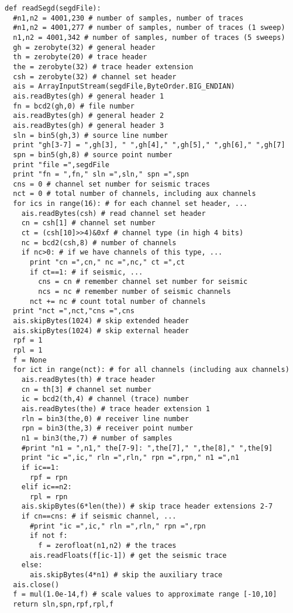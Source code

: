 \documentclass[11pt]{article}
\begin{document}
\begin{enumerate}
\begin{lstlisting}
def readSegd(segdFile):
  #n1,n2 = 4001,230 # number of samples, number of traces
  #n1,n2 = 4001,277 # number of samples, number of traces (1 sweep)
  n1,n2 = 4001,342 # number of samples, number of traces (5 sweeps)
  gh = zerobyte(32) # general header
  th = zerobyte(20) # trace header
  the = zerobyte(32) # trace header extension
  csh = zerobyte(32) # channel set header
  ais = ArrayInputStream(segdFile,ByteOrder.BIG_ENDIAN)
  ais.readBytes(gh) # general header 1
  fn = bcd2(gh,0) # file number
  ais.readBytes(gh) # general header 2
  ais.readBytes(gh) # general header 3
  sln = bin5(gh,3) # source line number
  print "gh[3-7] = ",gh[3], " ",gh[4]," ",gh[5]," ",gh[6]," ",gh[7] 
  spn = bin5(gh,8) # source point number
  print "file =",segdFile
  print "fn = ",fn," sln =",sln," spn =",spn
  cns = 0 # channel set number for seismic traces
  nct = 0 # total number of channels, including aux channels
  for ics in range(16): # for each channel set header, ...
    ais.readBytes(csh) # read channel set header
    cn = csh[1] # channel set number
    ct = (csh[10]>>4)&0xf # channel type (in high 4 bits)
    nc = bcd2(csh,8) # number of channels
    if nc>0: # if we have channels of this type, ...
      print "cn =",cn," nc =",nc," ct =",ct
      if ct==1: # if seismic, ...
        cns = cn # remember channel set number for seismic
        ncs = nc # remember number of seismic channels
      nct += nc # count total number of channels
  print "nct =",nct,"cns =",cns
  ais.skipBytes(1024) # skip extended header
  ais.skipBytes(1024) # skip external header
  rpf = 1
  rpl = 1
  f = None
  for ict in range(nct): # for all channels (including aux channels)
    ais.readBytes(th) # trace header
    cn = th[3] # channel set number
    ic = bcd2(th,4) # channel (trace) number
    ais.readBytes(the) # trace header extension 1
    rln = bin3(the,0) # receiver line number
    rpn = bin3(the,3) # receiver point number
    n1 = bin3(the,7) # number of samples
    #print "n1 = ",n1," the[7-9]: ",the[7]," ",the[8]," ",the[9]
    print "ic =",ic," rln =",rln," rpn =",rpn," n1 =",n1
    if ic==1:
      rpf = rpn
    elif ic==n2:
      rpl = rpn
    ais.skipBytes(6*len(the)) # skip trace header extensions 2-7
    if cn==cns: # if seismic channel, ...
      #print "ic =",ic," rln =",rln," rpn =",rpn
      if not f:
        f = zerofloat(n1,n2) # the traces
      ais.readFloats(f[ic-1]) # get the seismic trace
    else:
      ais.skipBytes(4*n1) # skip the auxiliary trace
  ais.close()
  f = mul(1.0e-14,f) # scale values to approximate range [-10,10]
  return sln,spn,rpf,rpl,f


\end{lstlisting}
\end{enumerate}
\end{document}
